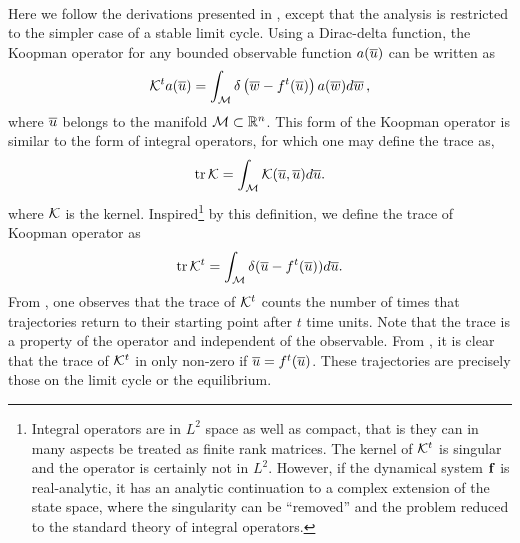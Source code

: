 \begin{description}
\\
Here we follow the derivations  presented in
, %
except that the analysis is restricted to the simpler case of a
stable limit cycle. Using a Dirac-delta function, the Koopman
operator for any bounded observable function $a(\overline{u})$ can be written
as
%
\begin{equation}\nonumber
{\cal K}^t a(\overline{u}) =
  \int_{{\cal M}}\delta\left(\overline{w}-{f^{t}(\overline{u})}\right)a(\overline{w})d\overline{w}
\,,
\end{equation}
%
where $\overline{u}$ belongs to the manifold ${\cal M}\subset\mathbb{R}^n$.
This form of the Koopman operator is similar to the form of integral
operators, for which one may define the trace as,
%
\[
\mbox{\rm tr}\, {\cal K} =\int_{{\cal M}}{\cal K}(\overline{u},\overline{u})d\overline{u}.
\]
%
where ${\cal K}$ is the kernel.
Inspired\footnote{
Integral operators are in $L^2$ space as well as compact, that is
they can in many aspects be treated as finite rank matrices. The
kernel of ${\cal K}^t$ is singular and the operator is certainly not in
$L^2$. However, if the dynamical system ${\bf f}$ is real-analytic, it
has an analytic continuation to a complex extension of the state
space, where the singularity can be ``removed'' and the problem
reduced to the standard theory of integral operators.}
by this definition, we define the trace of Koopman operator as
%
\begin{equation}
 \mbox{\rm tr}\, {\cal K}^t = \int_{{\cal M}}\delta(\overline{u}-{f^{t}(\overline{u})})d\overline{u}.
\label{eq:tr2}
\end{equation}
%
%
From , one observes that the trace of ${\cal K}^t$ counts
the number of times that trajectories return to their starting point
after $t$ time units.
Note that the trace  is  a property of the
operator and independent of the observable.  From , it
is clear that the trace of ${\cal K}^t$ in only non-zero if $\overline{u}={f^{t}(\overline{u})}$.
These trajectories are precisely those on the limit cycle or  the
equilibrium.


\end{description}
